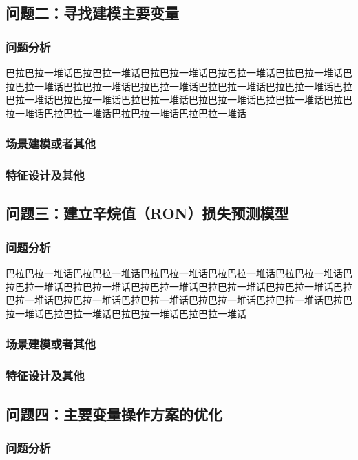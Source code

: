 \documentclass[bwprint]{gmcmthesis}
\begin{document}
\subsection{问题二：寻找建模主要变量}
\subsubsection{问题分析}

巴拉巴拉一堆话巴拉巴拉一堆话巴拉巴拉一堆话巴拉巴拉一堆话巴拉巴拉一堆话巴拉巴拉一堆话巴拉巴拉一堆话巴拉巴拉一堆话巴拉巴拉一堆话巴拉巴拉一堆话巴拉巴拉一堆话巴拉巴拉一堆话巴拉巴拉一堆话巴拉巴拉一堆话巴拉巴拉一堆话巴拉巴拉一堆话巴拉巴拉一堆话巴拉巴拉一堆话巴拉巴拉一堆话
\subsubsection{场景建模或者其他}

\subsubsection{特征设计及其他}


\subsection{问题三：建立辛烷值（RON）损失预测模型}
\subsubsection{问题分析}

巴拉巴拉一堆话巴拉巴拉一堆话巴拉巴拉一堆话巴拉巴拉一堆话巴拉巴拉一堆话巴拉巴拉一堆话巴拉巴拉一堆话巴拉巴拉一堆话巴拉巴拉一堆话巴拉巴拉一堆话巴拉巴拉一堆话巴拉巴拉一堆话巴拉巴拉一堆话巴拉巴拉一堆话巴拉巴拉一堆话巴拉巴拉一堆话巴拉巴拉一堆话巴拉巴拉一堆话巴拉巴拉一堆话

\subsubsection{场景建模或者其他}

\subsubsection{特征设计及其他}
\subsection{问题四：主要变量操作方案的优化}
\subsubsection{问题分析}
\end{document}
